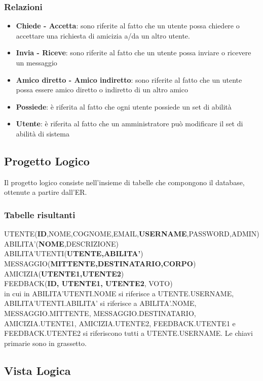 \subsubsection{Relazioni}
\begin{itemize}
 \item {\bfseries Chiede - Accetta}: sono riferite al fatto che un utente possa chiedere o accettare una richiesta di amicizia a/da un altro utente.
 \item {\bfseries Invia - Riceve}: sono riferite al fatto che un utente possa inviare o ricevere un messaggio
 \item {\bfseries Amico diretto - Amico indiretto}: sono riferite al fatto che un utente possa essere amico diretto o indiretto di un altro amico
 \item {\bfseries Possiede}: è riferita al fatto che ogni utente possiede un set di abilità
 \item {\bfseries Utente}: è riferita al fatto che un amministratore può modificare il set di abilità di sistema
\end{itemize}

\subsection{Progetto Logico}
Il progetto logico consiste nell'insieme di tabelle che compongono il database, ottenute a partire dall'ER.
\subsubsection{Tabelle risultanti}
\noindent
UTENTE({\bfseries ID},NOME,COGNOME,EMAIL,{\bfseries USERNAME},PASSWORD,ADMIN)\\
ABILITA'({\bfseries NOME},DESCRIZIONE)\\
ABILITA'UTENTI({\bfseries UTENTE,ABILITA'})\\
MESSAGGIO({\bfseries MITTENTE,DESTINATARIO,CORPO})\\
AMICIZIA({\bfseries UTENTE1,UTENTE2})\\
FEEDBACK({\bfseries ID, UTENTE1, UTENTE2}, VOTO)\\

\noindent
in cui in ABILITA'UTENTI.NOME si riferisce a UTENTE.USERNAME, ABILITA'UTENTI.ABILITA' si riferisce a ABILITA'.NOME, MESSAGGIO.MITTENTE, MESSAGGIO.DESTINATARIO, AMICIZIA.UTENTE1,
AMICIZIA.UTENTE2, FEEDBACK.UTENTE1 e FEEDBACK.UTENTE2 si riferiscono tutti a UTENTE.USERNAME. Le chiavi primarie sono in grassetto.

\subsection{Vista Logica}